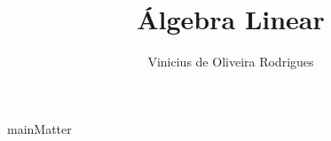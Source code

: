\documentclass{book}
\author{Vinicius de Oliveira Rodrigues}
\title{Álgebra Linear}
\begin{document}
\maketitle

\frontmatter
\tableofcontents
\mainmatter
{mainMatter}
\appendix
\backmatter
\printindex
\end{document}
